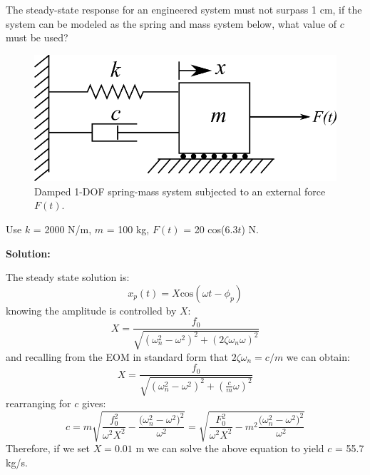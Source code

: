 \documentclass[12pt,letter]{article}
\begin{document}
\begin{example}



	The steady-state response for an engineered system must not surpass 1 cm, if the system can be modeled as the spring and mass system below, what value of $c$ must be used?  
	\begin{figure}[H]
		\centering
		\includegraphics[]{../figures/1-DOF-spring_dashpot_mass_horizontal_forced.png}
		\caption{Damped 1-DOF spring-mass system subjected to an external force $F(t)$.}
	\end{figure}	
	\noindent Use $k$ = 2000 N/m, $m$ = 100 kg, $F(t)$ = 20 cos($6.3t$) N. 			

	\noindent\textbf{Solution:}

	 The steady state solution is:
	\begin{equation}
		x_p(t) = X \text{cos}(\omega t - \phi_p)
	\end{equation}			 
	knowing the amplitude is controlled by $X$: 
	\begin{equation}
		X = \frac{f_0}{\sqrt{(\omega_n^2 - \omega^2)^2 +  (2\zeta \omega_n \omega)^2}} 
	\end{equation}	
	and recalling from the EOM in standard form that $2\zeta \omega_n = c/m$ we can obtain:
	\begin{equation}
		X = \frac{f_0}{\sqrt{(\omega_n^2 - \omega^2)^2 +  (\frac{c}{m} \omega)^2}} 
	\end{equation}		
	rearranging for $c$ gives:		
	\begin{equation}
		c = m\sqrt{\frac{f_0^2}{\omega^2 X^2}-\frac{\big(\omega_n^2-\omega^2\big)^2}{\omega^2}} = \sqrt{\frac{F_0^2}{\omega^2 X^2}-m^2\frac{\big(\omega_n^2-\omega^2\big)^2}{\omega^2}} 
	\end{equation}
	Therefore, if we set $X=0.01$ m we can solve the above equation to yield $c$ = 55.7 kg/s.
	
\end{example}	
\end{document}
